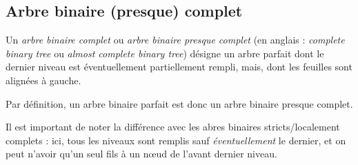 \documentclass[11pt,a4paper]{article}
\begin{document}
\medskip

\subsection{Arbre binaire (presque) complet}

Un \textit{arbre binaire complet} ou \textit{arbre binaire presque complet} (en anglais : \textit{complete binary tree} ou \textit{almost complete binary tree}) désigne un arbre parfait dont le dernier niveau est éventuellement partiellement rempli, mais, dont les feuilles sont alignées à gauche.


Par définition, un arbre binaire parfait est donc un arbre binaire presque complet.

Il est important de noter la différence avec les abres binaires stricts/localement complets : ici, tous les niveaux sont remplis sauf \textit{éventuellement} le dernier, et on peut n'avoir qu'un seul fils à un nœud de l'avant dernier niveau.
\end{document}
